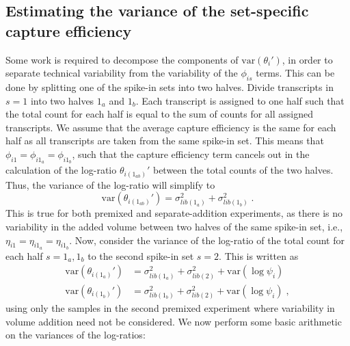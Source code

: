\documentclass{article}
\begin{document}

\subsection{Estimating the variance of the set-specific capture efficiency}
Some work is required to decompose the components of $\mbox{var}(\theta_i')$, in order to separate technical variability from the variability of the $\phi_{is}$ terms.
This can be done by splitting one of the spike-in sets into two halves.
Divide transcripts in $s=1$ into two halves $1_a$ and $1_b$.
Each transcript is assigned to one half such that the total count for each half is equal to the sum of counts for all assigned transcripts.
We assume that the average capture efficiency is the same for each half as all transcripts are taken from the same spike-in set.
This means that $\phi_{i1} = \phi_{i1_a} = \phi_{i1_b}$, such that the capture efficiency term cancels out in the calculation of the log-ratio $\theta_{i(1_{ab})}'$ between the total counts of the two halves.
Thus, the variance of the log-ratio will simplify to 
\[
    \mbox{var}(\theta_{i(1_{ab})}') = \sigma^2_{lib(1_a)} + \sigma^2_{lib(1_b)} \;.
\]
This is true for both premixed and separate-addition experiments, as there is no variability in the added volume between two halves of the same spike-in set, i.e.,  $\eta_{i1} = \eta_{i1_a} = \eta_{i1_b}$.
Now, consider the variance of the log-ratio of the total count for each half $s=1_a, 1_b$ to the second spike-in set $s=2$.
This is written as
\begin{align*}
    \mbox{var}(\theta_{i(1_a)}') &= \sigma^2_{lib(1_a)} + \sigma^2_{lib(2)} + \mbox{var}(\log \psi_i) \\
    \mbox{var}(\theta_{i(1_b)}') &= \sigma^2_{lib(1_b)} + \sigma^2_{lib(2)} + \mbox{var}(\log \psi_i) \;,
\end{align*}
using only the samples in the second premixed experiment where variability in volume addition need not be considered.
We now perform some basic arithmetic on the variances of the log-ratios:
\end{document}
